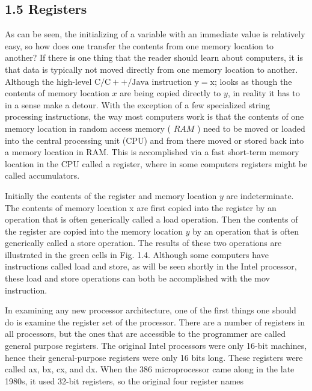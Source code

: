 \documentclass[10pt]{book}
\begin{document}
\subsection*{1.5 Registers}
As can be seen, the initializing of a variable with an immediate value is relatively easy, so how does one transfer the contents from one memory location to another? If there is one thing that the reader should learn about computers, it is that data is typically not moved directly from one memory location to another. Although the high-level $\mathrm{C} / \mathrm{C}++/ \mathrm{Java}$ instruction $\mathrm{y}=\mathrm{x}$; looks as though the contents of memory location $x$ are being copied directly to $y$, in reality it has to in a sense make a detour. With the exception of a few specialized string processing instructions, the way most computers work is that the contents of one memory location in random access memory ( $R A M$ ) need to be moved or loaded into the central processing unit (CPU) and from there moved or stored back into a memory location in RAM. This is accomplished via a fast short-term memory location in the CPU called a register, where in some computers registers might be called accumulators.

Initially the contents of the register and memory location $y$ are indeterminate. The contents of memory location x are first copied into the register by an operation that is often generically called a load operation. Then the contents of the register are copied into the memory location $y$ by an operation that is often generically called a store operation. The results of these two operations are illustrated in the green cells in Fig. 1.4. Although some computers have instructions called load and store, as will be seen shortly in the Intel processor, these load and store operations can both be accomplished with the mov instruction.

In examining any new processor architecture, one of the first things one should do is examine the register set of the processor. There are a number of registers in all processors, but the ones that are accessible to the programmer are called general purpose registers. The original Intel processors were only 16-bit machines, hence their general-purpose registers were only 16 bits long. These registers were called ax, bx, cx, and dx. When the 386 microprocessor came along in the late 1980s, it used 32-bit registers, so the original four register names

\end{document}
